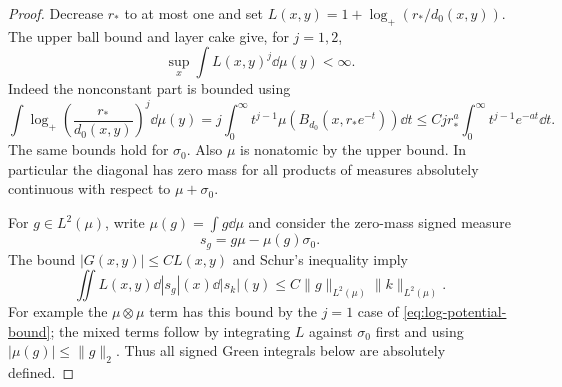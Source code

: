 \begin{proof}
Decrease $r_*$ to at most one and set
$L(x,y)=1+\log_+(r_*/d_0(x,y))$.  The upper ball bound and layer cake
give, for $j=1,2$,
\begin{equation}\label{eq:log-potential-bound}
 \sup_x\int L(x,y)^j\dd\mu(y)<\infty.
\end{equation}
Indeed the nonconstant part is bounded using
\[
 \int\log_+\!\left(\frac{r_*}{d_0(x,y)}\right)^j\dd\mu(y)
 =j\int_0^\infty t^{j-1}\mu(B_{d_0}(x,r_*e^{-t}))\dd t
 \le Cj r_*^a\int_0^\infty t^{j-1}e^{-at}\dd t.
\]
The same bounds hold for $\sigma_0$.  Also $\mu$ is nonatomic by the
upper bound.  In particular the diagonal has zero mass for all products
of measures absolutely continuous with respect to $\mu+\sigma_0$.

For $g\in L^2(\mu)$, write $\mu(g)=\int g\dd\mu$ and consider the
zero-mass signed measure
\[
 s_g=g\mu-\mu(g)\sigma_0.
\]
The bound $|G(x,y)|\le C L(x,y)$ and Schur's inequality imply
\begin{equation}\label{eq:signed-log-energy}
 \iint L(x,y)\dd|s_g|(x)\dd|s_k|(y)
       \le C\|g\|_{L^2(\mu)}\|k\|_{L^2(\mu)}.
\end{equation}
For example the $\mu\otimes\mu$ term has this bound by the $j=1$ case
of \eqref{eq:log-potential-bound}; the mixed terms follow by integrating
$L$ against $\sigma_0$ first and using $|\mu(g)|\le\|g\|_2$.  Thus all
signed Green integrals below are absolutely defined.


\end{proof}
